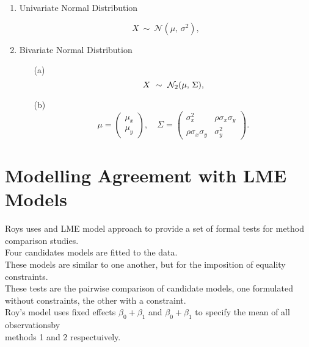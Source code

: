 \documentclass[12pt, a4paper]{article}
\begin{document}
\bigskip

\begin{enumerate}
	\item Univariate Normal Distribution
	
	\[
	X\ \sim\ \mathcal{N}(\mu,\, \sigma^2),
	\]
	
	\item Bivariate Normal Distribution
	
	\begin{itemize}
		\item[(a)] \[  X\ \sim\ \mathcal{N}_2(\mu,\, \Sigma), \vspace{1cm}\]
		\item[(b)] \[    \mu = \begin{pmatrix} \mu_x \\ \mu_y \end{pmatrix}, \quad
		\Sigma = \begin{pmatrix} \sigma_x^2 & \rho \sigma_x \sigma_y \\
		\rho \sigma_x \sigma_y  & \sigma_y^2 \end{pmatrix}.\]
	\end{itemize}
\end{enumerate}



\section{Modelling Agreement with LME Models}



Roys uses and LME model approach to provide a set of formal tests for method comparison studies.\\

Four candidates models are fitted to the data.\\

These models are similar to one another, but for the imposition of equality constraints.\\

These tests are the pairwise comparison of candidate models, one formulated without constraints, the other with a constraint.\\


Roy's model uses fixed effects $\beta_0 + \beta_1$ and $\beta_0 + \beta_1$ to specify the mean of all observationsby \\ methods 1 and 2 respectuively.
\end{document}
